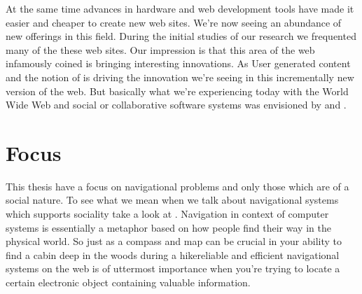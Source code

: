 At the same time advances in hardware and web development tools have made it
easier and cheaper to create new web sites. We're now seeing an
abundance of new offerings in this field.
During the initial studies of our research we frequented
many of the these web sites. Our impression is that
this area of the web infamously coined %
is bringing interesting innovations. As
User generated content and the notion of  is
driving the innovation we're seeing in this incrementally new version of the
web. But basically what we're experiencing today with the World Wide Web
and social or collaborative software systems was envisioned by \citet{bush45}
and \citet{licklider68}.

\section{Focus}

This thesis have a focus on navigational problems and only those
which are of a social nature. To see what we mean when we talk about
navigational systems which supports sociality take a look at
.
Navigation in context of computer systems is
essentially a metaphor based on how people find their way in the physical
world. So just as a compass and map can be crucial in your ability to find a
cabin deep in the woods during a hike\dash{}reliable and efficient
navigational systems on the web is of uttermost importance when you're trying
to locate a certain electronic object containing valuable information.


